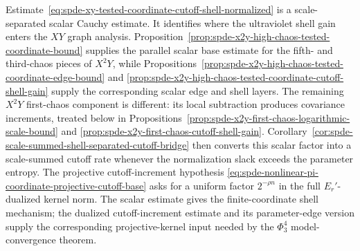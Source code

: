 \begin{remark}
\label{rem:spde-xy-scalar-shell-versus-projective-cutoff}
Estimate~\eqref{eq:spde-xy-tested-coordinate-cutoff-shell-normalized} is a
scale-separated scalar Cauchy estimate.  It identifies where the ultraviolet
shell gain enters the \(XY\) graph analysis.
Proposition~\ref{prop:spde-x2y-high-chaos-tested-coordinate-bound} supplies
the parallel scalar base estimate for the fifth- and third-chaos pieces of
\(X^2Y\), while
Propositions~\ref{prop:spde-x2y-high-chaos-tested-coordinate-edge-bound} and
\ref{prop:spde-x2y-high-chaos-tested-coordinate-cutoff-shell-gain} supply the
corresponding scalar edge and shell layers.  The remaining \(X^2Y\)
first-chaos component is different: its local subtraction produces covariance
increments, treated below in
Propositions~\ref{prop:spde-x2y-first-chaos-logarithmic-scale-bound} and
\ref{prop:spde-x2y-first-chaos-cutoff-shell-gain}.
Corollary~\ref{cor:spde-scale-summed-shell-separated-cutoff-bridge} then
converts this scalar factor into a scale-summed cutoff rate whenever the
normalization slack exceeds the parameter entropy.  The projective
cutoff-increment hypothesis
\eqref{eq:spde-nonlinear-pi-coordinate-projective-cutoff-base} asks for a
uniform factor \(2^{-\rho n}\) in the full \(E_r'\)-dualized kernel norm.
The scalar estimate gives the finite-coordinate shell mechanism; the
dualized cutoff-increment estimate and its parameter-edge version supply the
corresponding projective-kernel input needed by the \(\Phi^4_3\)
model-convergence theorem.
\end{remark}

